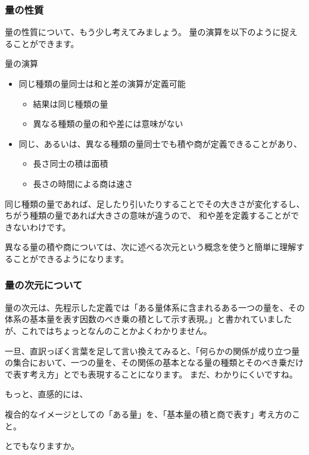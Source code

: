 \documentclass[uplatex,dvipdfmx,a4paper,11pt]{jsarticle}
\begin{document}
\subsubsection{量の性質}

量の性質について、もう少し考えてみましょう。
量の演算を以下のように捉えることができます。
\large
	\begin{itembox}[l]{量の演算}
		\begin{itemize}
			\item 同じ種類の量同士は和と差の演算が定義可能
			\begin{itemize}
				\item 結果は同じ種類の量
				\item 異なる種類の量の和や差には意味がない
			\end{itemize}
			\item 同じ、あるいは、異なる種類の量同士でも積や商が定義できることがあり、
			\begin{itemize}
				\item 長さ同士の積は面積
				\item 長さの時間による商は速さ
			\end{itemize}
		\end{itemize}
	\end{itembox}
\normalsize

同じ種類の量であれば、足したり引いたりすることでその大きさが変化するし、ちがう種類の量であれば大きさの意味が違うので、
和や差を定義することができないわけです。

異なる量の積や商については、次に述べる次元という概念を使うと簡単に理解することができるようになります。

\subsubsection{量の次元について}

量の次元は、先程示した定義では「ある量体系に含まれるある一つの量を、その体系の基本量を表す因数のべき乗の積として示す表現。」と書かれていましたが、これではちょっとなんのことかよくわかりません。

一旦、直訳っぽく言葉を足して言い換えてみると、「何らかの関係が成り立つ量の集合において、一つの量を、その関係の基本となる量の種類とそのべき乗だけで表す考え方」とでも表現することになります。
まだ、わかりにくいですね。

もっと、直感的には、
\begin{shadebox}
	\large
	複合的なイメージとしての「ある量」を、「基本量の積と商で表す」考え方のこと。
\end{shadebox}
とでもなりますか。
\end{document}
